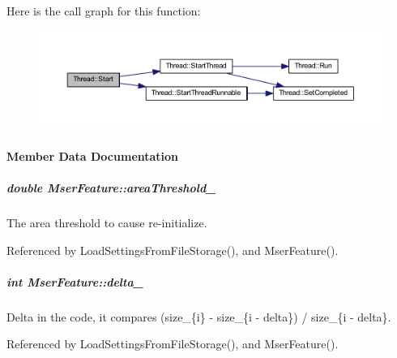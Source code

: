 Here is the call graph for this function\-:
\nopagebreak
\begin{figure}[H]
\begin{center}
\leavevmode
\includegraphics[width=350pt]{group___core_a2b42f82341afd2747ea093b6ac8b91cb_cgraph}
\end{center}
\end{figure}




\paragraph{Member Data Documentation}
\hypertarget{group___feature_extractor_ade4ed6ec57dbfefd1a263fa29419e54d}{
\subparagraph[{area\-Threshold\-\_\-}]{\setlength{\rightskip}{0pt plus 5cm}double Mser\-Feature\-::area\-Threshold\-\_\-\hspace{0.3cm}{\ttfamily [private]}}}\label{group___feature_extractor_ade4ed6ec57dbfefd1a263fa29419e54d}


The area threshold to cause re-\/initialize. 



Referenced by Load\-Settings\-From\-File\-Storage(), and Mser\-Feature().

\hypertarget{group___feature_extractor_a55dae2de52e614532d2243ca113fb3fb}{
\subparagraph[{delta\-\_\-}]{\setlength{\rightskip}{0pt plus 5cm}int Mser\-Feature\-::delta\-\_\-\hspace{0.3cm}{\ttfamily [private]}}}\label{group___feature_extractor_a55dae2de52e614532d2243ca113fb3fb}


Delta in the code, it compares (size\-\_\-\{i\} -\/ size\-\_\-\{i -\/ delta\}) / size\-\_\-\{i -\/ delta\}. 



Referenced by Load\-Settings\-From\-File\-Storage(), and Mser\-Feature().

